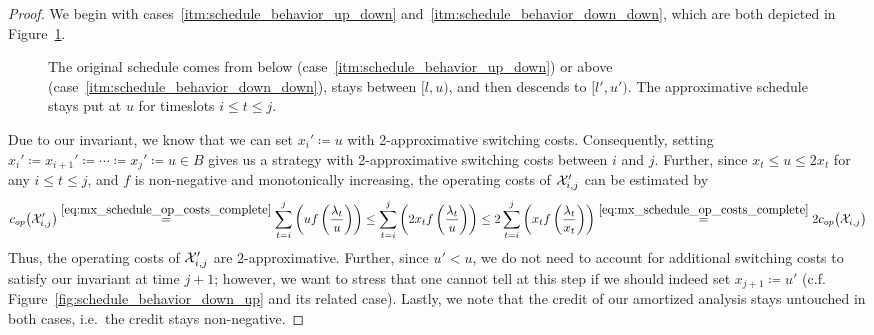\begin{proof}
We begin with cases~\ref{itm:schedule_behavior_up_down} and~\ref{itm:schedule_behavior_down_down}, which are both depicted in Figure~\ref{fig:schedule_behavior_down}.
\begin{figure}[ht]
\captionsetup[subfigure]{labelformat=empty}
\begin{subfigure}[b]{0.49\textwidth}

\end{subfigure}
\hfill
\begin{subfigure}[b]{0.49\textwidth}

\end{subfigure}
\caption{The original schedule comes from below (case~\ref{itm:schedule_behavior_up_down}) or above (case~\ref{itm:schedule_behavior_down_down}), stays between $[l,u)$, and then descends to $[l',u')$. The approximative schedule stays put at $u$ for timeslots $i\le t\le j$.}
\label{fig:schedule_behavior_down}
\end{figure}
Due to our invariant, we know that we can set $x_i'\coloneqq u$ with 2-approximative switching costs. Consequently, setting $x_i'\coloneqq x_{i+1}'\coloneqq\dotsb\coloneqq x_j'\coloneqq u\in B$ gives us a strategy with 2-approximative switching costs between $i$ and $j$. Further, since $x_t\le u\le2x_t$ for any $i\le t\le j$, and $f$ is non-negative and monotonically increasing, the operating costs of $\mathcal{X}'_{i,j}$ can be estimated by
\begin{equation*}
	c_{op}\bigl(\mathcal{X}_{i,j}'\bigr)\stackrel{\eqref{eq:mx_schedule_op_costs_complete}}{=}\sum\limits_{t=i}^j\left(uf\left(\frac{\lambda_t}{u}\right)\right)\le\sum\limits_{t=i}^j\left(2x_tf\left(\frac{\lambda_t}{u}\right)\right)\le2\sum\limits_{t=i}^j\left(x_tf\left(\frac{\lambda_t}{x_t}\right)\right)\stackrel{\eqref{eq:mx_schedule_op_costs_complete}}{=}2c_{op}\bigl(\mathcal{X}_{i,j}\bigr)
\end{equation*}
Thus, the operating costs of $\mathcal{X}_{i,j}'$ are 2-approximative. Further, since $u'<u$, we do not need to account for additional switching costs to satisfy our invariant at time $j+1$; however, we want to stress that one cannot tell at this step if we should indeed set $x_{j+1}\coloneqq u'$ (c.f. Figure~\ref{fig:schedule_behavior_down_up} and its related case). Lastly, we note that the credit of our amortized analysis stays untouched in both cases, i.e.\ the credit stays non-negative.
	

\end{proof}
